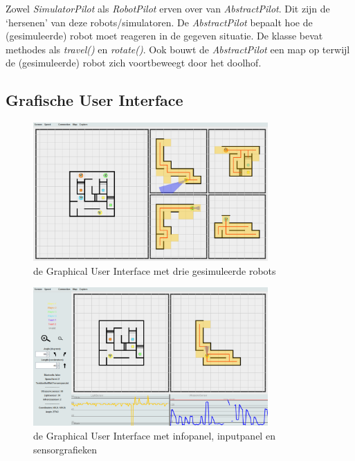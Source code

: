 \documentclass[tt3]{penoverslag}
\begin{document}
 Zowel \textit{SimulatorPilot} als \textit{RobotPilot} erven over van \textit{AbstractPilot}. Dit zijn de `hersenen' van deze robots/simulatoren. De \textit{AbstractPilot} bepaalt hoe de (gesimuleerde) robot moet reageren in de gegeven situatie. De klasse bevat methodes als \textit{travel()} en \textit{rotate()}. Ook bouwt de \textit{AbstractPilot} een map op terwijl de (gesimuleerde) robot zich voortbeweegt door het doolhof.

\subsection{Grafische User Interface}
\label{ssec:GUI}

\begin{figure}[h]
\centering
	\includegraphics[width=0.8\textwidth]{GUI1}
\caption{de Graphical User Interface met drie gesimuleerde robots}
\label{fig:GUI1}
\end{figure}

\begin{figure}[h] %
\centering
	\includegraphics[width=0.8\textwidth]{GUI2}
\caption{de Graphical User Interface met infopanel, inputpanel en sensorgrafieken}
\label{fig:GUI2}
\end{figure}
\end{document}
